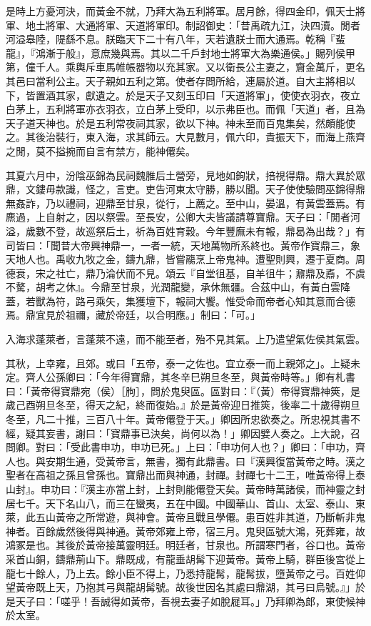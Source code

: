 \begin{pinyinscope}
是時上方憂河決，而黃金不就，乃拜大為五利將軍。居月餘，得四金印，佩天士將軍、地土將軍、大通將軍、天道將軍印。制詔御史：「昔禹疏九江，決四瀆。閒者河溢皋陸，隄繇不息。朕臨天下二十有八年，天若遺朕士而大通焉。乾稱『蜚龍』，『鴻漸于般』，意庶幾與焉。其以二千戶封地士將軍大為樂通侯。」賜列侯甲第，僮千人。乘輿斥車馬帷帳器物以充其家。又以衛長公主妻之，齎金萬斤，更名其邑曰當利公主。天子親如五利之第。使者存問所給，連屬於道。自大主將相以下，皆置酒其家，獻遺之。於是天子又刻玉印曰「天道將軍」，使使衣羽衣，夜立白茅上，五利將軍亦衣羽衣，立白茅上受印，以示弗臣也。而佩「天道」者，且為天子道天神也。於是五利常夜祠其家，欲以下神。神未至而百鬼集矣，然頗能使之。其後治裝行，東入海，求其師云。大見數月，佩六印，貴振天下，而海上燕齊之閒，莫不搤捥而自言有禁方，能神僊矣。

其夏六月中，汾陰巫錦為民祠魏脽后土營旁，見地如鉤狀，掊視得鼎。鼎大異於眾鼎，文鏤毋款識，怪之，言吏。吏告河東太守勝，勝以聞。天子使使驗問巫錦得鼎無姦詐，乃以禮祠，迎鼎至甘泉，從行，上薦之。至中山，晏溫，有黃雲蓋焉。有麃過，上自射之，因以祭雲。至長安，公卿大夫皆議請尊寶鼎。天子曰：「閒者河溢，歲數不登，故巡祭后土，祈為百姓育穀。今年豐廡未有報，鼎曷為出哉？」有司皆曰：「聞昔大帝興神鼎一，一者一統，天地萬物所系終也。黃帝作寶鼎三，象天地人也。禹收九牧之金，鑄九鼎，皆嘗鬺烹上帝鬼神。遭聖則興，遷于夏商。周德衰，宋之社亡，鼎乃淪伏而不見。頌云『自堂徂基，自羊徂牛；鼐鼎及鼒，不虞不驁，胡考之休』。今鼎至甘泉，光潤龍變，承休無疆。合茲中山，有黃白雲降蓋，若獸為符，路弓乘矢，集獲壇下，報祠大饗。惟受命而帝者心知其意而合德焉。鼎宜見於祖禰，藏於帝廷，以合明應。」制曰：「可。」

入海求蓬萊者，言蓬萊不遠，而不能至者，殆不見其氣。上乃遣望氣佐侯其氣雲。

其秋，上幸雍，且郊。或曰「五帝，泰一之佐也。宜立泰一而上親郊之」。上疑未定。齊人公孫卿曰：「今年得寶鼎，其冬辛巳朔旦冬至，與黃帝時等。」卿有札書曰：「黃帝得寶鼎宛（侯）［朐］，問於鬼臾區。區對曰：『（黃）帝得寶鼎神筴，是歲己酉朔旦冬至，得天之紀，終而復始。』於是黃帝迎日推筴，後率二十歲得朔旦冬至，凡二十推，三百八十年。黃帝僊登于天。」卿因所忠欲奏之。所忠視其書不經，疑其妄書，謝曰：「寶鼎事已決矣，尚何以為！」卿因嬖人奏之。上大說，召問卿。對曰：「受此書申功，申功已死。」上曰：「申功何人也？」卿曰：「申功，齊人也。與安期生通，受黃帝言，無書，獨有此鼎書。曰『漢興復當黃帝之時。漢之聖者在高祖之孫且曾孫也。寶鼎出而與神通，封禪。封禪七十二王，唯黃帝得上泰山封』。申功曰：『漢主亦當上封，上封則能僊登天矣。黃帝時萬諸侯，而神靈之封居七千。天下名山八，而三在蠻夷，五在中國。中國華山、首山、太室、泰山、東萊，此五山黃帝之所常遊，與神會。黃帝且戰且學僊。患百姓非其道，乃斷斬非鬼神者。百餘歲然後得與神通。黃帝郊雍上帝，宿三月。鬼臾區號大鴻，死葬雍，故鴻冢是也。其後於黃帝接萬靈明廷。明廷者，甘泉也。所謂寒門者，谷口也。黃帝采首山銅，鑄鼎荊山下。鼎既成，有龍垂胡髯下迎黃帝。黃帝上騎，群臣後宮從上龍七十餘人，乃上去。餘小臣不得上，乃悉持龍髯，龍髯拔，墮黃帝之弓。百姓仰望黃帝既上天，乃抱其弓與龍胡髯號。故後世因名其處曰鼎湖，其弓曰烏號。』」於是天子曰：「嗟乎！吾誠得如黃帝，吾視去妻子如脫屣耳。」乃拜卿為郎，東使候神於太室。


\end{pinyinscope}
